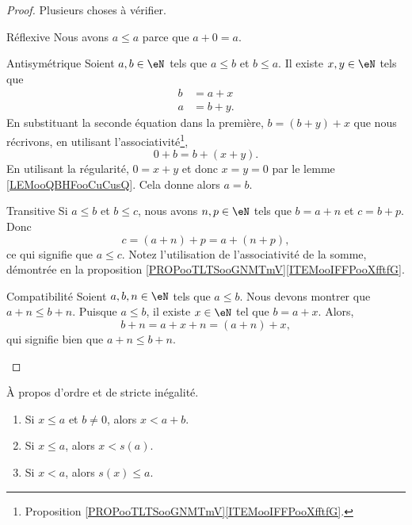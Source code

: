 \begin{proof}
    Plusieurs choses à vérifier.
    \begin{subproof}
    \item[Réflexive]
        Nous avons \( a\leq a\) parce que \( a+0=a\).
    \item[Antisymétrique]
        Soient \( a,b\in \eN\) tels que \( a\leq b\) et \( b\leq a\). Il existe \( x,y\in \eN\) tels que
        \begin{subequations}
            \begin{align}
                b&=a+x\\
                a&=b+y.
            \end{align}
        \end{subequations}
        En substituant la seconde équation dans la première, \( b=(b+y)+x\) que nous récrivons, en utilisant l'associativité\footnote{Proposition \ref{PROPooTLTSooGNMTmV}\ref{ITEMooIFFPooXfftfG}.},
        \begin{equation}
            0+b=b+(x+y).
        \end{equation}
        En utilisant la régularité, \( 0=x+y\) et donc \( x=y=0\) par le lemme \ref{LEMooQBHFooCuCusQ}. Cela donne alors \( a=b\).
    \item[Transitive]
        Si \( a\leq b\) et \( b\leq c\), nous avons \( n,p\in \eN\) tels que \( b=a+n\) et \( c=b+p\). Donc
        \begin{equation}
            c=(a+n)+p=a+(n+p),
        \end{equation}
        ce qui signifie que \( a\leq c\). Notez l'utilisation de l'associativité de la somme, démontrée en la proposition \ref{PROPooTLTSooGNMTmV}\ref{ITEMooIFFPooXfftfG}.
    \item[Compatibilité]
        Soient \( a,b,n\in \eN\) tels que \( a\leq b\). Nous devons montrer que \( a+n\leq b+n\). Puisque \( a\leq b\), il existe \( x\in \eN\) tel que \( b=a+x\). Alors,
        \begin{equation}
            b+n=a+x+n=(a+n)+x,
        \end{equation}
        qui signifie bien que \( a+n\leq b+n\).
    \end{subproof}
\end{proof}

\begin{lemma}       \label{LEMooPVRQooXPMKTt}
    À propos d'ordre et de stricte inégalité.
    \begin{enumerate}
        \item       \label{ITEMooGWWFooYGPCZw}
            Si \( x\leq a\) et \( b\neq 0\), alors \( x<a+b\).
        \item       \label{ITEMooRWGWooAfkrri}
            Si \( x\leq a\), alors \( x<s(a)\).
        \item       \label{ITEMooWCOIooMWrCag}
            Si \( x<a\), alors \( s(x)\leq a\).
    \end{enumerate}
\end{lemma}

